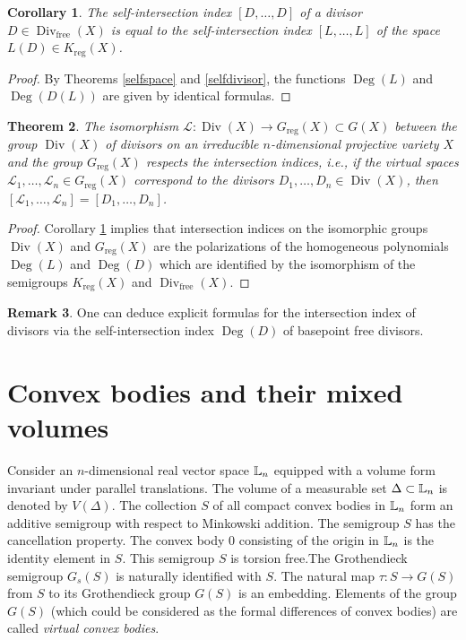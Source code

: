 \documentclass[11pt]{article}
\theoremstyle{plain}
\newtheorem{theorem}{Theorem}[section]
\newtheorem{corollary}[theorem]{Corollary}
\theoremstyle{definition}
\newtheorem{remark}[theorem]{Remark}
\newcommand\Div{\operatorname{Div}}
\newcommand\D{\operatorname{Deg}}
\begin{document}
\begin{corollary}\label{self-intersection}  The self-intersection index $ [D,\dots,D]$ of a   divisor $D\in \Div_\mathrm{free} (X)$ is equal to the self-intersection index $ [L,\dots, L]$ of the  space $L(D) \in K_\mathrm{reg} (X)$.
\end{corollary}

\begin{proof} By Theorems \ref{selfspace} and \ref{selfdivisor}, the functions $\D(L)$  and $\D (D(L))$ are given by identical formulas.
\end{proof}

\begin{theorem} The isomorphism  $\mathcal L:\Div (X)\to  G_\mathrm{reg}(X)\subset G(X)$  between the group $\Div (X)$ of  divisors on an irreducible $n$-dimensional projective variety $X$    and the group $G_\mathrm{reg}(X)$   respects the intersection indices, i.e., if  the virtual spaces $\mathcal L_1,\dots, \mathcal L_n\in G_\mathrm{reg} (X)$ correspond to the  divisors $D_1,\dots, D_n\in \Div (X)$,   then $[\mathcal L_1,\dots,\mathcal L_n]= [D_1,\dots,D_n]$.
\end{theorem}

\begin{proof} Corollary \ref{self-intersection} implies that intersection indices on the  isomorphic groups $\Div (X)$ and $G_\mathrm{reg}(X)$ are the polarizations of the homogeneous polynomials $\D(L)$ and $\D (D)$ which are identified by the isomorphism of the semigroups $K_\mathrm{reg}(X)$ and $\Div_\mathrm{free}(X)$.
\end{proof}


\begin{remark} One can deduce explicit formulas for the intersection index of   divisors  via
the self-intersection index $\D (D)$ of basepoint free  divisors.
\end{remark}


\section{Convex bodies and their  mixed volumes}\label{sect6}

Consider an $n$-dimensional real vector space $\Bbb L_n$ equipped with a volume form invariant under parallel translations. The volume of a measurable set $\Delta\subset \Bbb L_n$ is denoted by $V(\Delta)$. The collection $S$  of all compact convex bodies in $\Bbb L_n$ form an additive  semigroup with respect to Minkowski addition. The semigroup $S$ has the cancellation property.  The convex body $0$ consisting of the origin in $\Bbb L_n$ is the identity element in $S$.  This semigroup $S$ is torsion free.The Grothendieck semigroup $G_s(S)$ is naturally identified with $S$.  The natural map $\tau:S\to G(S)$  from $S$ to its Grothendieck  group $G(S)$ is an embedding.   Elements of  the  group $G(S)$ (which could be considered as the formal differences of convex bodies) are called {\it virtual convex bodies}.
\end{document}
